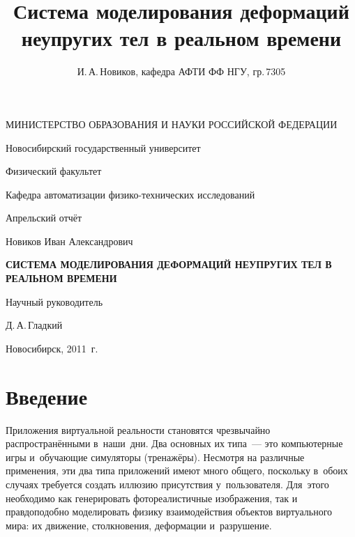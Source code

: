 \documentclass[a4paper, 14pt, titlepage]{extarticle}
\author{И.\,А.\,Новиков, кафедра АФТИ ФФ НГУ, гр.\,7305}
\title{Система моделирования деформаций неупругих тел в реальном времени}
\let\oldsection\section
\renewcommand{\section}{\newpage\oldsection}
\begin{document}

  \thispagestyle{empty}
  \begin {center}
  МИНИСТЕРСТВО ОБРАЗОВАНИЯ И НАУКИ РОССИЙСКОЙ ФЕДЕРАЦИИ

  \vspace{0.3cm}

  Новосибирский государственный университет

  \vspace{0.3cm}

  Физический факультет

  Кафедра автоматизации физико-технических исследований

  \vspace {5cm}

  Апрельский отчёт

  \vspace {1cm}

  Новиков Иван Александрович

  \vspace {0.5cm}

  \textbf{СИСТЕМА МОДЕЛИРОВАНИЯ ДЕФОРМАЦИЙ НЕУПРУГИХ ТЕЛ В РЕАЛЬНОМ ВРЕМЕНИ}

  \vspace {2cm}

  \begin{flushright}

    Научный руководитель

    Д.\,А.\,Гладкий

  \end{flushright}

  \vspace {5cm}

  Новосибирск, 2011~г.
  \end {center}


  \tableofcontents
  \newpage

  \section{Введение}

    Приложения виртуальной реальности становятся чрезвычайно рас\-прос\-тра\-нён\-ны\-ми в~наши~дни.  Два
    основных их типа~--- это компьютерные игры и~обучающие симуляторы (тренажёры). Несмотря на
    различные применения, эти два типа приложений имеют много общего, поскольку в~обоих случаях
    требуется создать иллюзию присутствия у~пользователя. Для~этого необходимо как генерировать
    фотореалистичные изображения, так и правдоподобно моделировать физику взаимодействия объектов
    виртуального мира: их движение, столкновения, деформации и~разрушение.
\end{document}

